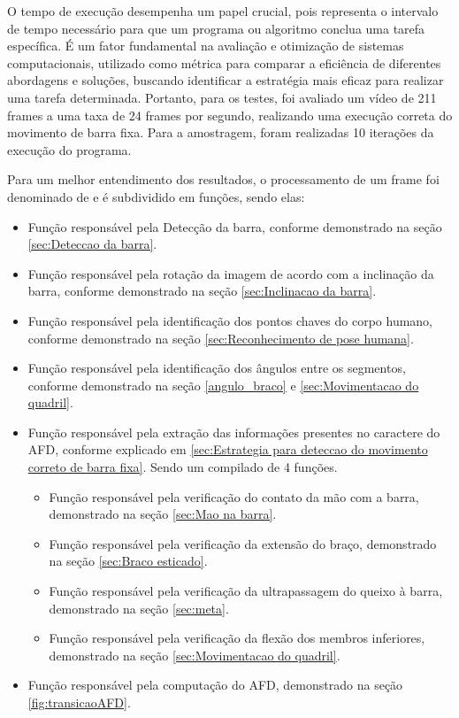 O tempo de execução desempenha um papel crucial, pois representa o intervalo de tempo necessário para que um programa ou algoritmo conclua uma tarefa específica. É um fator fundamental na avaliação e otimização de sistemas computacionais, utilizado como métrica para comparar a eficiência de diferentes abordagens e soluções, buscando identificar a estratégia mais eficaz para realizar uma tarefa determinada. Portanto, para os testes, foi avaliado um vídeo de 211 frames a uma taxa de 24 frames por segundo, realizando uma execução correta do movimento de barra fixa. Para a amostragem, foram realizadas 10 iterações da execução do programa.


\newpage
Para um melhor entendimento dos resultados, o processamento de um frame foi denominado de  e é subdividido em funções, sendo elas:

\begin{itemize}
	\item Função  responsável pela Detecção da barra, conforme demonstrado na seção \ref{sec:Deteccao da barra}.
	\item Função  responsável pela rotação da imagem de acordo com a inclinação da barra, conforme demonstrado na seção \ref{sec:Inclinacao da barra}.
	\item Função  responsável pela identificação dos pontos chaves do corpo humano, conforme demonstrado na seção \ref{sec:Reconhecimento de pose humana}.
	\item Função  responsável pela identificação dos ângulos entre os segmentos, conforme demonstrado na seção \ref{angulo_braco} e \ref{sec:Movimentacao do quadril}. 
	\item Função  responsável pela extração das informações presentes no caractere do \ac{AFD}, conforme explicado em \ref{sec:Estrategia para deteccao do movimento correto de barra fixa}. Sendo um compilado de 4 funções.
		
	\begin{itemize}
		
		\item Função  responsável pela verificação do contato da mão com a barra, demonstrado na seção \ref{sec:Mao na barra}.
		\item Função  responsável pela verificação da extensão do braço, demonstrado na seção \ref{sec:Braco esticado}.
		\item Função  responsável pela verificação da ultrapassagem do queixo à barra, demonstrado na seção \ref{sec:meta}.
		\item Função  responsável pela verificação da flexão dos membros inferiores, demonstrado na seção \ref{sec:Movimentacao do quadril}.

	\end{itemize}

	\item Função  responsável pela computação do \ac{AFD}, demonstrado na seção \ref{fig:transicaoAFD}.

\end{itemize}

